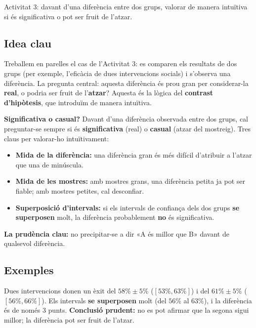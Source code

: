 %
{Activitat 3: davant d'una diferència entre dos grups, valorar de manera intuïtiva si és significativa o pot ser fruit de l'atzar.}

\subsection{Idea clau}

Treballem en parelles el cas de l'Activitat 3: es comparen els resultats de dos grups (per
exemple, l'eficàcia de dues intervencions socials) i s'observa una diferència. La pregunta
central: aquesta diferència és prou gran per considerar-la \textbf{real}, o podria ser fruit
de l'\textbf{atzar}? Aquesta és la lògica del \textbf{contrast d'hipòtesis}, que
introduïm de manera intuïtiva.

\begin{idea}
\textbf{Significativa o casual?} Davant d'una diferència observada entre dos grups, cal
preguntar-se sempre si és \textbf{significativa} (real) o \textbf{casual} (atzar del
mostreig). Tres claus per valorar-ho intuïtivament:
\begin{itemize}[leftmargin=1.4em, itemsep=2pt]
  \item \textbf{Mida de la diferència:} una diferència gran és més difícil d'atribuir a
        l'atzar que una de minúscula.
  \item \textbf{Mida de les mostres:} amb mostres grans, una diferència petita ja pot ser
        fiable; amb mostres petites, cal desconfiar.
  \item \textbf{Superposició d'intervals:} si els intervals de confiança dels dos grups
        \textbf{se superposen} molt, la diferència probablement \textbf{no} és
        significativa.
\end{itemize}
\textbf{La prudència clau:} no precipitar-se a dir «A és millor que B» davant de qualsevol
diferència.
\end{idea}

\subsection{Exemples}

\begin{exemple}
Dues intervencions donen un èxit del $58\%\pm 5\%$ ($[53\%,63\%]$) i del $61\%\pm 5\%$
($[56\%,66\%]$). Els intervals \textbf{se superposen} molt (del $56\%$ al $63\%$), i la
diferència és de només $3$ punts. \textbf{Conclusió prudent:} no es pot afirmar que la
segona sigui millor; la diferència pot ser fruit de l'atzar.
\end{exemple}

